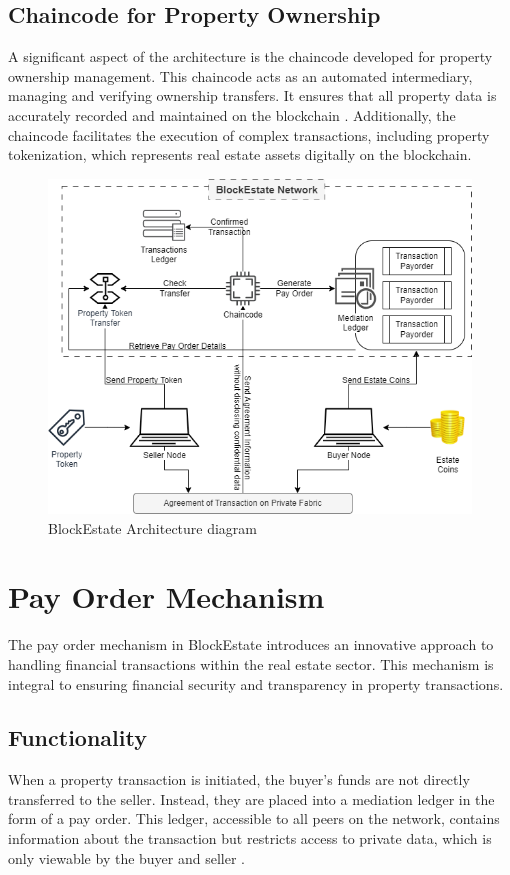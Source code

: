 \documentclass[3p,times]{elsarticle}
\begin{document}
\subsection{Chaincode for Property Ownership}
A significant aspect of the architecture is the chaincode developed for property ownership management. This chaincode acts as an automated intermediary, managing and verifying ownership transfers. It ensures that all property data is accurately recorded and maintained on the blockchain \cite{mehendale2019implications}. Additionally, the chaincode facilitates the execution of complex transactions, including property tokenization, which represents real estate assets digitally on the blockchain.


\begin{figure}[H]
    \centering
    \includegraphics[width=1\linewidth]{images/Bllockchain.drawio.png}
    \caption{BlockEstate Architecture diagram}
    \label{fig:fig1}
\end{figure}

\section{Pay Order Mechanism}

The pay order mechanism in BlockEstate introduces an innovative approach to handling financial transactions within the real estate sector. This mechanism is integral to ensuring financial security and transparency in property transactions.

\subsection{Functionality}
When a property transaction is initiated, the buyer's funds are not directly transferred to the seller. Instead, they are placed into a mediation ledger in the form of a pay order. This ledger, accessible to all peers on the network, contains information about the transaction but restricts access to private data, which is only viewable by the buyer and seller \cite{avantaggiato2019challenges}.
\end{document}
